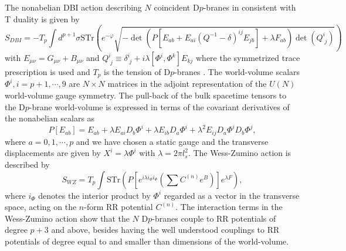 \documentclass[12pt,a4paper]{article}
\newcommand{\la}{\lambda}
\begin{document}
The nonabelian DBI action describing $N$ coincident D$p$-branes 
in consistent with T duality is given by
\begin{equation}
S_{DBI} = - T_p \int d^{p+1}\sigma \mathrm{STr} (e^{-\varphi}
\sqrt{-\det (P[ E_{ab} + E_{ai}(Q^{-1} - \delta)^{ij}E_{jb}] +
\la F_{ab}) \det (Q^i_{\;j})} )
\label{dbi}\end{equation}
with $E_{\mu\nu} = G_{\mu\nu} + B_{\mu\nu}$ and $Q^i_{\;j} \equiv
\delta^i_{\;j} + i\la [\Phi^i, \Phi^k]E_{kj}$ where the symmetrized trace
prescription is used and $T_p$ is the tension of D$p$-branes \cite{RCM}.
The world-volume scalars $\Phi^i, i = p+1, \cdots, 9$ are $N \times N$
matrices in the adjoint representation of the $U(N)$ world-volume gauge
symmetry. The pull-back of the bulk spacetime tensors to the D$p$-brane
world-volume is expressed in terms of the covariant derivatives of 
the nonabelian scalars as
\begin{equation}
P[E_{ab}] = E_{ab} + \la E_{ai}D_b\Phi^i + \la E_{ib}D_a\Phi^i +
\la^2 E_{ij}D_a\Phi^i D_b\Phi^j,
\end{equation}
where $a =0,1, \cdots, p$ and we have chosen a static gauge and the 
transverse displacements are given by $X^i = \la \Phi^i$ with 
$\la = 2\pi l^2_s$. The Wess-Zumino action is described by
\begin{equation}
S_{WZ} = T_p \int \mathrm{STr}(P[e^{i\la i_{\Phi}i_{\Phi}}(\sum
C^{(n)}e^B)] e^{\la F}),
\label{wz}\end{equation}
where $i_{\Phi}$ denotes the interior product by $\Phi^i$ regarded as a
vector in the transverse space, acting on the $n$-form RR potential 
$C^{(n)}$. The interaction terms in the Wess-Zumino action
show that the $N$ D$p$-branes couple
to RR potentials of degree $p+3$ and above, besides having the well
understood couplings to RR potentials of degree equal to and
smaller than dimensions of the world-volume.
\end{document}
